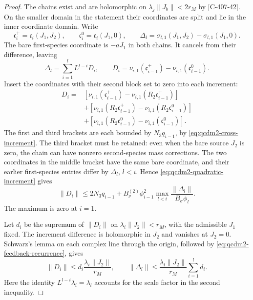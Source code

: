 \documentclass[11pt,letterpaper,reqno]{amsart}
\theoremstyle{definition}
\theoremstyle{remark}
\begin{document}
\begin{proof}
The chains exist and are holomorphic on
$\lambda_j\|J_b\|<2r_M$ by \cref{C-407-42}.
On the smaller domain in the statement their coordinates
are split and lie in the inner coordinate domain.
Write
\[
 \mathfrak c_i^+=\mathfrak c_i(J_1,J_2),\qquad
 \mathfrak c_i^0=\mathfrak c_i(J_1,0),\qquad
 \Delta_l=\sigma_{l,1}(J_1,J_2)-\sigma_{l,1}(J_1,0).
\]
The bare first-species coordinate is $-aJ_1$ in both
chains.  It cancels from their difference, leaving
\begin{equation}\label{eq:qcdm2-feedback-recurrence}
 \Delta_l=\sum_{i=1}^l L^{l-i}D_i,\qquad
 D_i=\nu_{i,1}(\mathfrak c_{i-1}^+)
                  -\nu_{i,1}(\mathfrak c_{i-1}^0).
\end{equation}
Insert the coordinates with their second block set to
zero into each increment:
\begin{align*}
 D_i={}&
  [\nu_{i,1}(\mathfrak c_{i-1}^+)
       -\nu_{i,1}(R_2\mathfrak c_{i-1}^+)]\\
 &+[\nu_{i,1}(R_2\mathfrak c_{i-1}^+)
       -\nu_{i,1}(R_2\mathfrak c_{i-1}^0)]\\
 &+[\nu_{i,1}(R_2\mathfrak c_{i-1}^0)
       -\nu_{i,1}(\mathfrak c_{i-1}^0)].
\end{align*}
The first and third brackets are each bounded by
$N_3q_{i-1}$, by \eqref{eq:qcdm2-cross-increment}.
The third bracket must be retained: even when the bare
source $J_2$ is zero, the chain can have nonzero
second-species mass corrections.
The two coordinates in the middle bracket have the same
bare coordinate, and their earlier first-species entries
differ by $\Delta_l$, $l<i$.  Hence
\eqref{eq:qcdm2-quadratic-increment} gives
\begin{equation}\label{eq:qcdm2-feedback-increment}
 \|D_i\|\le2N_3q_{i-1}
   +B_\nu^{(2)}\phi_{i-1}^2
       \max_{l<i}\frac{\|\Delta_l\|}{B_\sigma\phi_l}.
\end{equation}
The maximum is zero at $i=1$.

Let $d_i$ be the supremum of $\|D_i\|$ on
$\lambda_i\|J_2\|<r_M$, with the admissible $J_1$ fixed.
The increment difference is holomorphic in $J_2$ and
vanishes at $J_2=0$.  Schwarz's lemma on each complex
line through the origin, followed by
\eqref{eq:qcdm2-feedback-recurrence}, gives
\begin{equation}\label{eq:qcdm2-feedback-Schwarz}
 \|D_i\|\le d_i\frac{\lambda_i\|J_2\|}{r_M},\qquad
 \|\Delta_l\|\le
      \frac{\lambda_l\|J_2\|}{r_M}\sum_{i=1}^l d_i.
\end{equation}
Here the identity $L^{l-i}\lambda_i=\lambda_l$ accounts
for the scale factor in the second inequality.


\end{proof}
\end{document}

